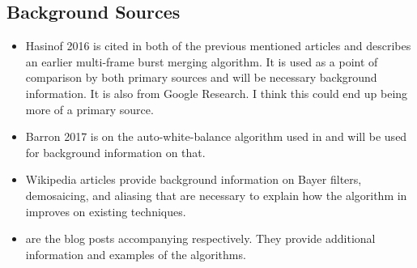 \documentclass{sig-alternate}
\begin{document}
\subsection{Background Sources}
\begin{itemize}
\item Hasinof 2016\cite{Hasinoff2016} is cited in both of the previous mentioned articles and describes an earlier multi-frame burst merging algorithm. It is used as a point of comparison by both primary sources and will be necessary background information. It is also from Google Research. I think this could end up being more of a primary source.
\item Barron 2017 \cite{Barron2017} is on the auto-white-balance algorithm used in \cite{Liba2019} and will be used for background information on that.
\item Wikipedia articles \cite{wiki:BayerFilter, wiki:Demosaicing, wiki:Aliasing} provide background information on Bayer filters, demosaicing, and aliasing that are necessary to explain how the algorithm in \cite{Wronski2019} improves on existing techniques.

\item \cite{blog:Wronski2018, blog:Levoy2018} are the blog posts accompanying \cite{Wronski2019, blog:Levoy2018} respectively. They provide additional information and examples of the algorithms.

\end{itemize}

  

\end{document}

